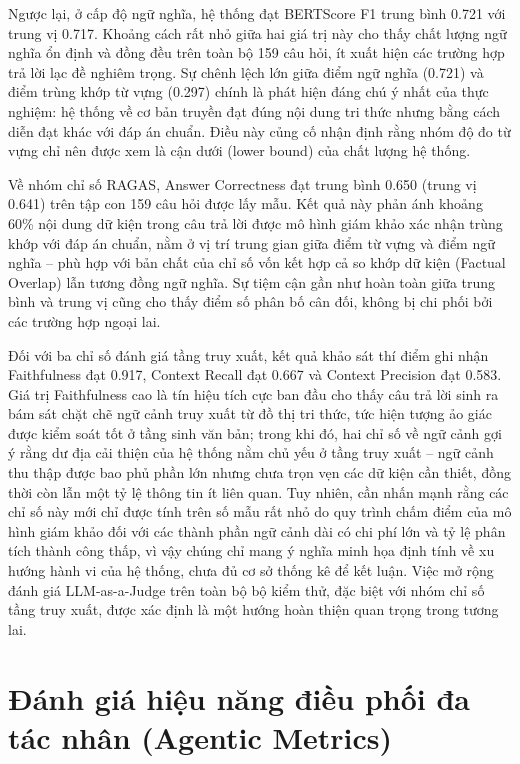 Ngược lại, ở cấp độ ngữ nghĩa, hệ thống đạt BERTScore F1 trung bình 0.721 với trung vị 0.717. Khoảng cách rất nhỏ giữa hai giá trị này cho thấy chất lượng ngữ nghĩa ổn định và đồng đều trên toàn bộ 159 câu hỏi, ít xuất hiện các trường hợp trả lời lạc đề nghiêm trọng. Sự chênh lệch lớn giữa điểm ngữ nghĩa (0.721) và điểm trùng khớp từ vựng (0.297) chính là phát hiện đáng chú ý nhất của thực nghiệm: hệ thống về cơ bản truyền đạt đúng nội dung tri thức nhưng bằng cách diễn đạt khác với đáp án chuẩn. Điều này củng cố nhận định rằng nhóm độ đo từ vựng chỉ nên được xem là cận dưới (lower bound) của chất lượng hệ thống.

Về nhóm chỉ số RAGAS, Answer Correctness đạt trung bình 0.650 (trung vị 0.641) trên tập con 159 câu hỏi được lấy mẫu. Kết quả này phản ánh khoảng 60\% nội dung dữ kiện trong câu trả lời được mô hình giám khảo xác nhận trùng khớp với đáp án chuẩn, nằm ở vị trí trung gian giữa điểm từ vựng và điểm ngữ nghĩa -- phù hợp với bản chất của chỉ số vốn kết hợp cả so khớp dữ kiện (Factual Overlap) lẫn tương đồng ngữ nghĩa. Sự tiệm cận gần như hoàn toàn giữa trung bình và trung vị cũng cho thấy điểm số phân bố cân đối, không bị chi phối bởi các trường hợp ngoại lai.

Đối với ba chỉ số đánh giá tầng truy xuất, kết quả khảo sát thí điểm ghi nhận Faithfulness đạt 0.917, Context Recall đạt 0.667 và Context Precision đạt 0.583. Giá trị Faithfulness cao là tín hiệu tích cực ban đầu cho thấy câu trả lời sinh ra bám sát chặt chẽ ngữ cảnh truy xuất từ đồ thị tri thức, tức hiện tượng ảo giác được kiểm soát tốt ở tầng sinh văn bản; trong khi đó, hai chỉ số về ngữ cảnh gợi ý rằng dư địa cải thiện của hệ thống nằm chủ yếu ở tầng truy xuất -- ngữ cảnh thu thập được bao phủ phần lớn nhưng chưa trọn vẹn các dữ kiện cần thiết, đồng thời còn lẫn một tỷ lệ thông tin ít liên quan. Tuy nhiên, cần nhấn mạnh rằng các chỉ số này mới chỉ được tính trên số mẫu rất nhỏ do quy trình chấm điểm của mô hình giám khảo đối với các thành phần ngữ cảnh dài có chi phí lớn và tỷ lệ phân tích thành công thấp, vì vậy chúng chỉ mang ý nghĩa minh họa định tính về xu hướng hành vi của hệ thống, chưa đủ cơ sở thống kê để kết luận. Việc mở rộng đánh giá LLM-as-a-Judge trên toàn bộ bộ kiểm thử, đặc biệt với nhóm chỉ số tầng truy xuất, được xác định là một hướng hoàn thiện quan trọng trong tương lai.

\section{Đánh giá hiệu năng điều phối đa tác nhân (Agentic Metrics)}
\label{sec:agentic_metrics}

